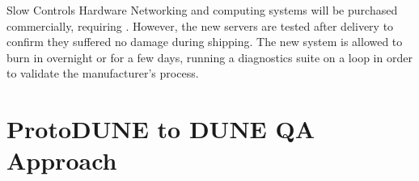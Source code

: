 Slow Controls Hardware Networking and computing systems will be
purchased commercially, requiring . However, the new servers
are tested after delivery to confirm they suffered no damage during
shipping. The new system is allowed to burn in overnight or for a few
days, running a diagnostics suite on a loop in order to validate the
manufacturer's  process.


\section{ProtoDUNE to DUNE QA Approach}

